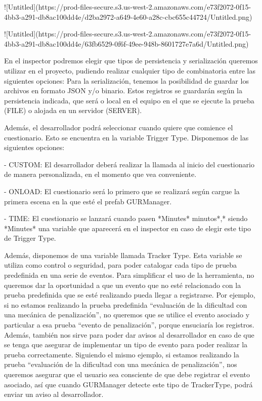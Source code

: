 ![Untitled](https://prod-files-secure.s3.us-west-2.amazonaws.com/e73f2072-0f15-4bb3-a291-db8ac100dd4e/d2ba2972-a649-4e60-a28c-cbc655c44724/Untitled.png)

![Untitled](https://prod-files-secure.s3.us-west-2.amazonaws.com/e73f2072-0f15-4bb3-a291-db8ac100dd4e/63fb6529-0f6f-49ee-948b-8601727e7a6d/Untitled.png)

En el inspector podremos elegir que tipos de persistencia y serialización queremos utilizar en el proyecto, pudiendo realizar cualquier tipo de combinatoria entre las siguientes opciones: Para la serialización, tenemos la posibilidad de guardar los archivos en formato JSON y/o binario. Estos registros se guardarán según la persistencia indicada, que será o local en el equipo en el que se ejecute la prueba (FILE) o alojada en un servidor (SERVER).

Además, el desarrollador podrá seleccionar cuando quiere que comience el cuestionario. Esto se encuentra en la variable Trigger Type. Disponemos de las siguientes opciones:

- CUSTOM: El desarrollador deberá realizar la llamada al inicio del cuestionario de manera personalizada, en el momento que vea conveniente.

- ONLOAD: El cuestionario será lo primero que se realizará según cargue la primera escena en la que esté el prefab GURManager.

- TIME: El cuestionario se lanzará cuando pasen *Minutes* minutos*,* siendo *Minutes* una variable que aparecerá en el inspector en caso de elegir este tipo de Trigger Type.

Además, disponemos de una variable llamada Tracker Type. Esta variable se utiliza como control o seguridad, para poder catalogar cada tipo de prueba predefinida en una serie de eventos. Para simplificar el uso de la herramienta, no queremos dar la oportunidad a que un evento que no esté relacionado con la prueba predefinida que se esté realizando pueda llegar a registrarse. Por ejemplo, si no estamos realizando la prueba predefinida “evaluación de la dificultad con una mecánica de penalización”, no queremos que se utilice el evento asociado y particular a esa prueba “evento de penalización”, porque ensuciaría los registros. Además, también nos sirve para poder dar avisos al desarrollador en caso de que se tenga que asegurar de implementar un tipo de evento para poder realizar la prueba correctamente. Siguiendo el mismo ejemplo, si estamos realizando la prueba “evaluación de la dificultad con una mecánica de penalización”, nos queremos asegurar que el usuario sea consciente de que debe registrar el evento asociado, así que cuando GURManager detecte este tipo de TrackerType, podrá enviar un aviso al desarrollador. 

